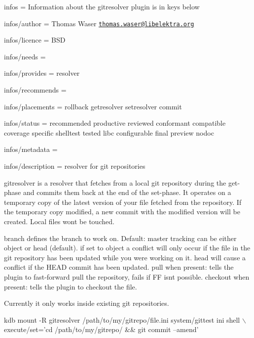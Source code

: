 
\begin{DoxyItemize}
\item infos = Information about the gitresolver plugin is in keys below
\item infos/author = Thomas Waser \href{mailto:thomas.waser@libelektra.org}{\tt thomas.\+waser@libelektra.\+org}
\item infos/licence = B\+SD
\item infos/needs =
\item infos/provides = resolver
\item infos/recommends =
\item infos/placements = rollback getresolver setresolver commit
\item infos/status = recommended productive reviewed conformant compatible coverage specific shelltest tested libc configurable final preview nodoc
\item infos/metadata =
\item infos/description = resolver for git repositories
\end{DoxyItemize}

gitresolver is a resolver that fetches from a local git repository during the get-\/phase and commits them back at the end of the set-\/phase. It operates on a temporary copy of the latest version of your file fetched from the repository. If the temporary copy modified, a new commit with the modified version will be created. Local files won\textquotesingle{}t be touched.

{\ttfamily branch} defines the branch to work on. Default\+: master {\ttfamily tracking} can be either {\ttfamily object} or {\ttfamily head} (default). if set to {\ttfamily object} a conflict will only occur if the file in the git repository has been updated while you were working on it. {\ttfamily head} will cause a conflict if the {\ttfamily H\+E\+AD} commit has been updated. {\ttfamily pull} when present\+: tells the plugin to fast-\/forward pull the repository, fails if FF isn\textquotesingle{}t possible. {\ttfamily checkout} when present\+: tells the plugin to checkout the file.

Currently it only works inside existing git repositories.


\begin{DoxyCode}
kdb mount -R gitresolver /path/to/my/gitrepo/file.ini system/gittest ini shell \(\backslash\)
    execute/set='cd /path/to/my/gitrepo/ && git commit --amend'
\end{DoxyCode}
 